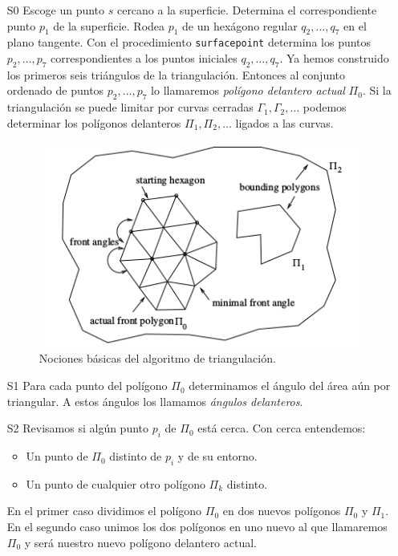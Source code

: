 \begin{enumerate}
\item[S0] Escoge un punto $s$ cercano a la superficie. Determina el correspondiente punto $p_1$ de la superficie. Rodea $p_1$ de un hexágono regular $q_2, \dotso, q_7$ en el plano tangente. Con el procedimiento \texttt{surfacepoint} determina los puntos $p_2, \dotso, p_7$ correspondientes a los  puntos iniciales $q_2, \dotso, q_7$.
Ya hemos construido los primeros seis triángulos de la triangulación.
Entonces al conjunto ordenado de puntos $p_2, \dotso, p_7$ lo llamaremos{ \em polígono delantero actual} $\Pi_0$. Si la triangulación se puede limitar por curvas cerradas $\Gamma_1, \Gamma_2,\dotso$ podemos determinar los polígonos delanteros $\Pi_1, \Pi_2, \dotso$ ligados a las curvas.
\begin{figure}[h]
	\centering
	\includegraphics[scale=0.7]{images/hartmann1.png}
	\caption{Nociones básicas del algoritmo de triangulación.}
\end{figure}	
	
\item[S1] Para cada punto del polígono $\Pi_0$ determinamos el ángulo del área aún por triangular. A estos ángulos los llamamos{ \em ángulos delanteros}.
	
\item[S2] Revisamos si algún punto $p_i$ de $\Pi_0$ está cerca. Con cerca entendemos:
\begin{itemize}
	\item Un punto de $\Pi_0$  distinto de $p_i$ y de su entorno.
	\item Un punto de cualquier otro polígono $\Pi_k$ distinto.
\end{itemize}
En el primer caso dividimos el polígono $\Pi_0$ en dos nuevos polígonos $\Pi_0$ y $\Pi_1$. En el segundo caso unimos los dos polígonos en uno nuevo al que llamaremos $\Pi_0$ y será nuestro nuevo polígono delantero actual.


\end{enumerate}

